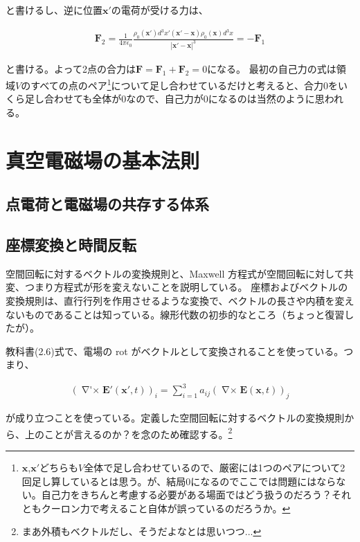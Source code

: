 \documentclass[a4j,12pt,uplatex,dvipdfmx]{jsreport}
\DeclareMathOperator{\rot}{\nabla\times}
\DeclareMathOperator{\rotp}{\nabla ' \times}
\begin{document}
と書けるし、逆に位置$\bm{x'}$の電荷が受ける力は、

\begin{align*}
  \bm{F}_2 = \frac{1}{4 \pi \epsilon_0}  \frac{\rho_0(\bm{x'}) d^3 x' (\bm{x'} - \bm{x}) \rho_0(\bm{x}) d^3 x}{| \bm{x'} - \bm{x} |^3} = - \bm{F}_1
\end{align*}

と書ける。よって2点の合力は$\bm{F} = \bm{F}_1 + \bm{F}_2 = 0$になる。
最初の自己力の式は領域$V$のすべての点のペア\footnote{$\bm{x}$,$\bm{x'}$どちらも$V$全体で足し合わせているので、厳密には1つのペアについて2回足し算しているとは思う。が、結局$0$になるのでここでは問題にはならない。自己力をきちんと考慮する必要がある場面ではどう扱うのだろう？それともクーロン力で考えること自体が誤っているのだろうか。}について足し合わせているだけと考えると、合力$0$をいくら足し合わせても全体が$0$なので、自己力が$0$になるのは当然のように思われる。

\chapter{真空電磁場の基本法則}

\section{点電荷と電磁場の共存する体系}

\section{座標変換と時間反転}

空間回転に対するベクトルの変換規則と、Maxwell 方程式が空間回転に対して共変、つまり方程式が形を変えないことを説明している。
座標およびベクトルの変換規則は、直行行列を作用させるような変換で、ベクトルの長さや内積を変えないものであることは知っている。線形代数の初歩的なところ（ちょっと復習したが）。

教科書(2.6)式で、電場の rot がベクトルとして変換されることを使っている。つまり、

\begin{align*}
  \left( \rotp \bm{E'}(\bm{x'}, t) \right)_i = \sum_{i=1}^{3} a_{ij} \left( \rot \bm{E} (\bm{x}, t) \right)_j
\end{align*}

が成り立つことを使っている。定義した空間回転に対するベクトルの変換規則から、上のことが言えるのか？を念のため確認する。\footnote{まあ外積もベクトルだし、そうだよなとは思いつつ...}
\end{document}
